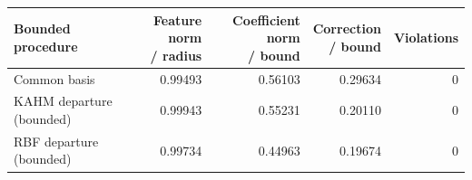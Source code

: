 \begin{tabular}{@{}lrrrr@{}}
\toprule
Bounded procedure & \shortstack{Feature norm\\/ radius} & \shortstack{Coefficient norm\\/ bound} & \shortstack{Correction\\/ bound} & Violations \\
\midrule
Common basis & 0.99493 & 0.56103 & 0.29634 & 0 \\
KAHM departure (bounded) & 0.99943 & 0.55231 & 0.20110 & 0 \\
RBF departure (bounded) & 0.99734 & 0.44963 & 0.19674 & 0 \\
\bottomrule
\end{tabular}
